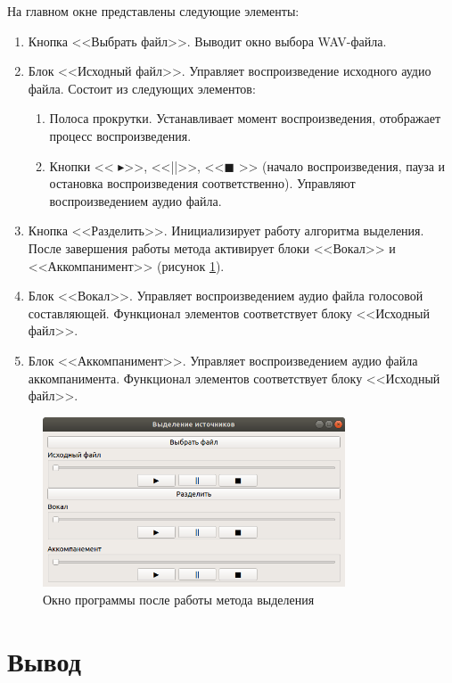 На главном окне представлены следующие элементы:

\begin{enumerate}
	\item Кнопка <<Выбрать файл>>. Выводит окно выбора WAV-файла.
	\item Блок <<Исходный файл>>. Управляет воспроизведение исходного аудио файла. Состоит из следующих элементов:
	\begin{enumerate}
		\item Полоса прокрутки. Устанавливает момент воспроизведения, отображает процесс воспроизведения.
		\item Кнопки << $ \blacktriangleright $>>, <<||>>, <<$\blacksquare$ >> (начало воспроизведения, пауза и остановка воспроизведения соответственно). Управляют воспроизведением аудио файла.
	\end{enumerate}
	\item Кнопка <<Разделить>>. Инициализирует работу алгоритма выделения. После завершения работы метода активирует блоки <<Вокал>> и <<Аккомпанимент>> (рисунок \ref{imp:complete}).

	\item Блок <<Вокал>>. Управляет воспроизведением аудио файла голосовой составляющей. Функционал элементов соответствует блоку <<Исходный файл>>.
	\item Блок <<Аккомпанимент>>. Управляет воспроизведением аудио файла аккомпанимента. Функционал элементов соответствует блоку <<Исходный файл>>. 
\end{enumerate}


\begin{figure}
	\centering
	\includegraphics[width=0.8\textwidth]{inc/img/complete-window}
	\caption{Окно программы после работы метода выделения}
	\label{imp:complete}
\end{figure}

\section{Вывод}

